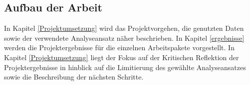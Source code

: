 \subsection{Aufbau der Arbeit}
In Kapitel \ref{Projektumsetzung} wird das Projektvorgehen, die genutzten Daten sowie der verwendete Analyseansatz näher beschrieben. In Kapitel \ref{ergebnisse} werden die Projektergebnisse für die einzelnen Arbeitspakete vorgestellt. In Kapitel \ref{Projektumsetzung} liegt der Fokus auf der Kritischen Reflektion der Projektergebnisse in hinblick auf die Limitierung des gewählte Analyseansatzes sowie die Beschreibung der nächsten Schritte.
